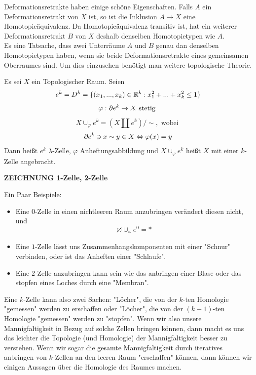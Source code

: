 Deformationsretrakte haben einige schöne Eigenschaften. Falls $A$ ein
Deformationsretrakt von $X$ ist, so ist die Inklusion $A \rightarrow X$ eine
Homotopieäquivalenz. Da Homotopieäquivalenz transitiv ist, hat ein weiterer
Deformationsretrakt $B$ von $X$ deshalb denselben Homotopietypen wie $A$. \\
Es eine Tatsache, dass zwei Unterräume $A$ und $B$ genau dan denselben 
Homotopietypen haben, wenn sie beide Deformationsretrakte eines gemeinsamen 
Oberraumes sind. Um dies einzusehen benötigt man weitere topologische 
Theorie.

\begin{definition}
    Es sei $X$ ein Topologischer Raum. Seien
    \[ e^k = D^k = \{(x_1, ..., x_k) \in { \mathbb R }^k: x_1^2 + ... + x_k^2 \leq 1\} \]
    \[ \varphi: { \partial } e^k \rightarrow X \text{ stetig } \]
    \[ X \cup_{\varphi} e^k = (X \amalg e^k) / \sim, \text{ wobei } \]
    \[ { \partial } e^k \ni x \sim y \in X \Leftrightarrow \varphi(x) = y \]
    Dann heißt $e^k$ $\lambda$-Zelle, $\varphi$ Anheftungsabbildung 
    und $X \cup_{\varphi} e^k$ heißt $X$ mit einer $k$-Zelle 
    angebracht.
\end{definition}

\textbf{ZEICHNUNG 1-Zelle, 2-Zelle}

Ein Paar Beispiele: 
\begin{itemize}
    \item Eine $0$-Zelle in einen nichtleeren Raum anzubringen 
        verändert diesen nicht, und
        \[\varnothing \cup_{\varphi} e^0 = \ast\]
    \item Eine $1$-Zelle lässt uns Zusammenhangskomponenten mit einer "Schnur"
            verbinden, oder ist das Anheften einer "Schlaufe".
    \item Eine $2$-Zelle anzubringen kann sein wie das anbringen einer Blase oder
        das stopfen eines Loches durch eine "Membran".
\end{itemize}

Eine $k$-Zelle kann also zwei Sachen: "Löcher", die von der $k$-ten Homologie
"gemessen" werden zu erschaffen oder "Löcher", die von der $(k-1)$-ten Homologie
"gemessen" werden zu "stopfen". Wenn wir also unsere Mannigfaltigkeit in 
Bezug auf solche Zellen bringen können, dann macht es uns das leichter die 
Topologie (und Homologie) der Mannigfaltigkeit besser zu verstehen. Wenn wir
sogar die gesamte Mannigfaltigkeit durch iteratives anbringen von $k$-Zellen
an den leeren Raum "erschaffen" können, dann können wir einigen Aussagen über 
die Homologie des Raumes machen. 


